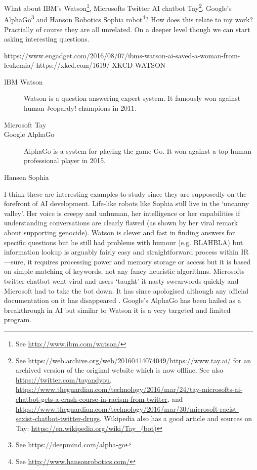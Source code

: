 What about IBM's Watson\footnote{See \url{http://www.ibm.com/watson/}}, Microsofts Twitter \ac{AI} chatbot Tay\footnote{See \url{https://web.archive.org/web/20160414074049/https://www.tay.ai/} for an archived version of the original website which is now offline. See also \url{https://twitter.com/tayandyou}, \url{https://www.theguardian.com/technology/2016/mar/24/tay-microsofts-ai-chatbot-gets-a-crash-course-in-racism-from-twitter}, and \url{https://www.theguardian.com/technology/2016/mar/30/microsoft-racist-sexist-chatbot-twitter-drugs}. Wikipedia also has a good article and sources on Tay: \url{https://en.wikipedia.org/wiki/Tay_(bot)}}, Google's AlphaGo\footnote{See \url{https://deepmind.com/alpha-go}} and Hanson Robotics Sophia robot\footnote{See \url{http://www.hansonrobotics.com/}}? How does this relate to my work? Practially of course they are all unrelated. On a deeper level though we can start asking interesting questions. 

https://www.engadget.com/2016/08/07/ibms-watson-ai-saved-a-woman-from-leukemia/
https://xkcd.com/1619/ XKCD WATSON

\begin{description}
  \item[IBM Watson] Watson is a question answering expert system. It famously won against human Jeopardy! champions in 2011.
  \item[Microsoft Tay] 
  \item[Google AlphaGo] AlphaGo is a system for playing the game Go. It won against a top human professional player in 2015.
  \item[Hansen Sophia]
\end{description}

I think these are interesting examples to study since they are supposedly on the forefront of \ac{AI} development. Life-like robots like Sophia still live in the `uncanny valley'. Her voice is creepy and unhuman, her intelligence or her capabilities if understanding conversations are clearly flawed (as shown by her viral remark about supporting genocide). Watson is clever and fast in finding answers for specific questions but he still had problems with humour (e.g. BLAHBLA) but information lookup is arguably fairly easy and straightforward process within \ac{IR}---sure, it requires processing power and memory storage or access but it is based on simple matching of keywords, not any fancy heuristic algorithms. Microsofts twitter chatbot went viral and users `taught' it nasty swearwords  quickly and Microsoft had to take the bot down. It has since apologised although any official documentation on it has disappeared . Google's AlphaGo has been hailed as a breakthrough in \ac{AI} but similar to Watson it is a very targeted and limited program. 

